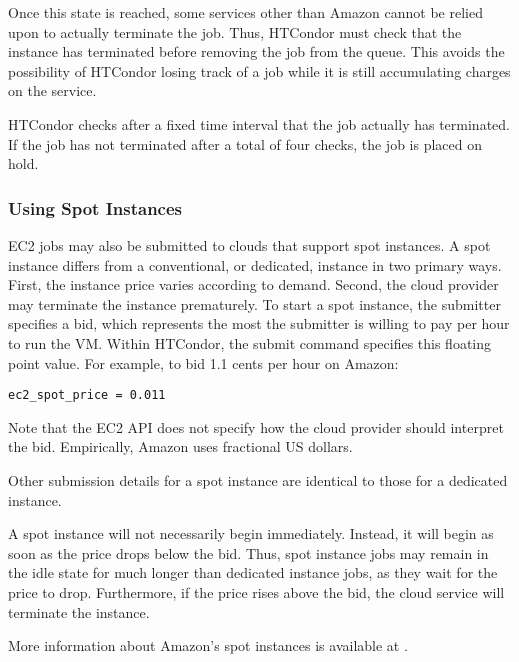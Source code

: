 Once this state is reached, some services other than Amazon cannot be
relied upon to actually terminate the job.
Thus, HTCondor must check that the instance has terminated
before removing the job from the queue.
This avoids the possibility of HTCondor losing track of a job
while it is still accumulating charges on the service.  

HTCondor checks after a fixed time interval
that the job actually has terminated.
If the job has not terminated after a total of four checks,
the job is placed on hold.

\subsubsection{\label{sec:spot-instances}Using Spot Instances}

EC2 jobs may also be submitted to clouds that support spot instances.
A spot instance differs from a conventional, or dedicated, instance in two
primary ways.
First, the instance price varies according to demand.
Second,
the cloud provider may terminate the instance prematurely.
To start a spot instance,
the submitter specifies a bid,
which represents the most the submitter is willing to pay per hour
to run the VM.
Within HTCondor, the submit command 
specifies this floating point value.
For example, 
to bid 1.1 cents per hour on Amazon:

\begin{verbatim}
ec2_spot_price = 0.011
\end{verbatim}

Note that the EC2 API does not specify how the cloud provider 
should interpret the bid.
Empirically, Amazon uses fractional US dollars.

Other submission details for a spot instance are identical to those
for a dedicated instance.

A spot instance will not necessarily begin immediately.
Instead, 
it will begin as soon as the price drops below the bid.
Thus, spot instance jobs
may remain in the idle state for much longer than dedicated instance jobs,
as they wait for the price to drop.
Furthermore, if the price rises above the bid, 
the cloud service will terminate the instance.

More information about Amazon's spot instances is available at
.

